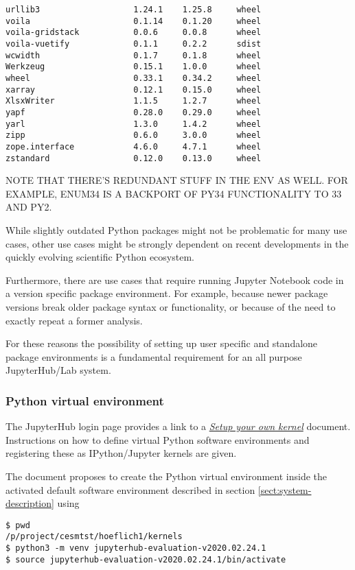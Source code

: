 \documentclass[11pt,a4paper]{article}
\begin{document}
\begin{verbatim}
urllib3                   1.24.1    1.25.8     wheel
voila                     0.1.14    0.1.20     wheel
voila-gridstack           0.0.6     0.0.8      wheel
voila-vuetify             0.1.1     0.2.2      sdist
wcwidth                   0.1.7     0.1.8      wheel
Werkzeug                  0.15.1    1.0.0      wheel
wheel                     0.33.1    0.34.2     wheel
xarray                    0.12.1    0.15.0     wheel
XlsxWriter                1.1.5     1.2.7      wheel
yapf                      0.28.0    0.29.0     wheel
yarl                      1.3.0     1.4.2      wheel
zipp                      0.6.0     3.0.0      wheel
zope.interface            4.6.0     4.7.1      wheel
zstandard                 0.12.0    0.13.0     wheel
\end{verbatim}

NOTE THAT THERE'S REDUNDANT STUFF IN THE ENV AS WELL. FOR EXAMPLE, ENUM34 IS A BACKPORT OF PY34 FUNCTIONALITY TO 33 AND PY2.

While slightly outdated Python packages might not be problematic for many use cases, other use cases might be strongly dependent on recent developments in the quickly evolving scientific Python ecosystem.

Furthermore, there are use cases that require running Jupyter Notebook code in a version specific package environment.
For example, because newer package versions break older package syntax or functionality, or because of the need to exactly repeat a former analysis.

For these reasons the possibility of setting up user specific and standalone package environments is a fundamental requirement for an all purpose JupyterHub/Lab system.

\subsubsection{Python virtual environment}
\label{sect:python-kernel:virtual-environment}

The JupyterHub login page provides a link to a \href{https://jupyter-jsc.fz-juelich.de/hub/static/files/kernel.html}{\emph{Setup your own kernel}} document.
Instructions on how to define virtual Python software environments and registering these as IPython/Jupyter kernels are given.

The document proposes to create the Python virtual environment inside the activated default software environment described in section \ref{sect:system-description} using

\begin{verbatim}
$ pwd
/p/project/cesmtst/hoeflich1/kernels
$ python3 -m venv jupyterhub-evaluation-v2020.02.24.1
$ source jupyterhub-evaluation-v2020.02.24.1/bin/activate
\end{verbatim}
\end{document}
